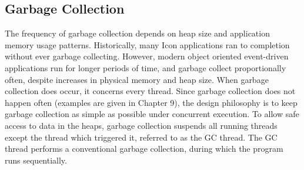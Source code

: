 \subsection{Garbage Collection}

The frequency of garbage collection depends on heap size and application memory usage patterns.
Historically, many Icon applications ran to completion without ever garbage collecting. However,
modern object oriented event-driven applications run for longer periods of time, and garbage
collect proportionally often, despite increases in physical memory and heap size. When garbage
collection does occur, it concerns every thread.
Since garbage collection does not happen often (examples are given in Chapter 9), the design
philosophy is to keep garbage collection as simple as possible under concurrent execution.
To allow safe access to data in the heaps, garbage collection suspends all running threads
except the thread which triggered it, referred to as the GC thread. The GC thread performs
a conventional garbage collection, during which the program runs sequentially. 


